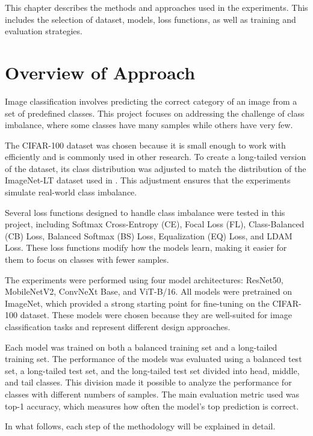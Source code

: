 
This chapter describes the methods and approaches used in the experiments. This includes the selection of dataset, models, loss functions, as well as training and evaluation strategies.

\section{Overview of Approach}

Image classification involves predicting the correct category of an image from a set of predefined classes. This project focuses on addressing the challenge of class imbalance, where some classes have many samples while others have very few.

The CIFAR-100 dataset \cite{krizhevsky2009learning} was chosen because it is small enough to work with efficiently and is commonly used in other research. To create a long-tailed version of the dataset, its class distribution was adjusted to match the distribution of the ImageNet-LT dataset used in \cite{zhang2023deep}. This adjustment ensures that the experiments simulate real-world class imbalance.

Several loss functions designed to handle class imbalance were tested in this project, including Softmax Cross-Entropy (CE), Focal Loss (FL), Class-Balanced (CB) Loss, Balanced Softmax (BS) Loss, Equalization (EQ) Loss, and LDAM Loss. These loss functions modify how the models learn, making it easier for them to focus on classes with fewer samples.

The experiments were performed using four model architectures: ResNet50, MobileNetV2, ConvNeXt Base, and ViT-B/16. All models were pretrained on ImageNet, which provided a strong starting point for fine-tuning on the CIFAR-100 dataset. These models were chosen because they are well-suited for image classification tasks and represent different design approaches.

Each model was trained on both a balanced training set and a long-tailed training set. The performance of the models was evaluated using a balanced test set, a long-tailed test set, and the long-tailed test set divided into head, middle, and tail classes. This division made it possible to analyze the performance for classes with different numbers of samples. The main evaluation metric used was top-1 accuracy, which measures how often the model's top prediction is correct.

In what follows, each step of the methodology will be explained in detail.

